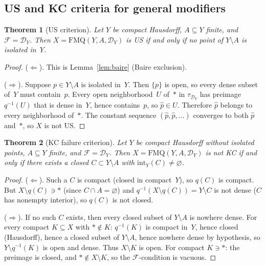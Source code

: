 \documentclass[11pt]{article}
\newtheorem{theorem}{Theorem}[section]
\theoremstyle{definition}
\theoremstyle{remark}
\begin{document}
\subsection{US and KC criteria for general modifiers}

\begin{theorem}[US criterion]\label{thm:USgeneral}
Let $Y$ be compact Hausdorff, $A \subseteq Y$ finite, and $\mathcal{F} = \mathcal{D}_Y$.
Then $X = \mathrm{FMQ}(Y, A, \mathcal{D}_Y)$ is US if and only if no point of
$Y \setminus A$ is isolated in~$Y$.
\end{theorem}

\begin{proof}
($\Leftarrow$). This is Lemma~\ref{lem:baire} (Baire exclusion).

($\Rightarrow$). Suppose $p \in Y \setminus A$ is isolated in~$Y$. Then $\{p\}$ is
open, so every dense subset of~$Y$ must contain~$p$. Every open neighborhood~$U$ of~$\ast$
in $\tau_{\mathcal{D}_Y}$
has preimage $q^{-1}(U)$ that is dense in~$Y$, hence contains~$p$, so $\hat{p} \in U$.
Therefore $\hat{p}$ belongs to every neighborhood of~$\ast$. The constant sequence
$(\hat{p}, \hat{p}, \ldots)$ converges to both $\hat{p}$ and~$\ast$, so $X$ is not US.
\end{proof}

\begin{theorem}[KC failure criterion]\label{thm:KCgeneral}
Let $Y$ be compact Hausdorff without isolated points, $A \subseteq Y$ finite, and
$\mathcal{F} = \mathcal{D}_Y$. Then $X = \mathrm{FMQ}(Y, A, \mathcal{D}_Y)$ is not KC
if and only if there exists a closed $C \subset Y \setminus A$ with
$\mathrm{int}_Y(C) \neq \varnothing$.
\end{theorem}

\begin{proof}
($\Leftarrow$). Such a $C$ is compact (closed in compact~$Y$), so $q(C)$ is compact.
But $X \setminus q(C) \ni \ast$ (since $C \cap A = \varnothing$) and
$q^{-1}(X \setminus q(C)) = Y \setminus C$ is not dense ($C$ has nonempty interior),
so $q(C)$ is not closed.

($\Rightarrow$). If no such $C$ exists, then every closed subset of $Y \setminus A$ is
nowhere dense. For every compact $K \subseteq X$ with $\ast \notin K$:
$q^{-1}(K)$ is compact in~$Y$, hence
closed (Hausdorff), hence a closed subset of $Y \setminus A$, hence
nowhere dense by hypothesis, so $Y \setminus q^{-1}(K)$ is open and dense.
Thus $X \setminus K$ is open. For compact $K \ni \ast$: the preimage is closed, and
$\ast \notin X \setminus K$, so the $\mathcal{F}$-condition is vacuous.
\end{proof}
\end{document}
